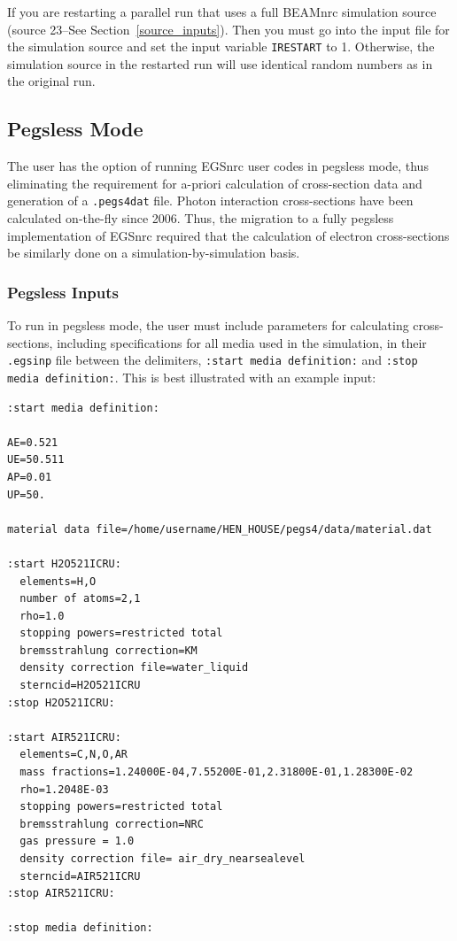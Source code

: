 \documentclass[12pt,twoside]{article}  %
\begin{document}
If you are restarting a parallel run that uses a full BEAMnrc simulation
source (source 23--See Section~\ref{source_inputs}).  Then you must go 
into the input file for the simulation source and set the input variable
{\tt IRESTART} to 1.  Otherwise, the simulation source in the restarted run
will use identical random numbers as in the original run.

\subsection{Pegsless Mode}
The user has the option of running EGSnrc user codes in pegsless
mode, thus eliminating the requirement for a-priori calculation of cross-section data and generation
of a {\tt .pegs4dat} file.  Photon interaction cross-sections have been calculated on-the-fly since
2006.  Thus, the migration to a fully pegsless implementation of EGSnrc required that
the calculation of electron cross-sections be similarly done on a simulation-by-simulation
basis.

\subsubsection{Pegsless Inputs}

To run in pegsless mode, the user must include parameters for calculating cross-sections, including
specifications for all media used in the simulation, in their {\tt .egsinp} file between the
delimiters, {\tt :start media definition:} and {\tt :stop media definition:}.  This is best illustrated
with an example input:

\begin{verbatim}
:start media definition:

AE=0.521
UE=50.511
AP=0.01
UP=50.

material data file=/home/username/HEN_HOUSE/pegs4/data/material.dat

:start H2O521ICRU:
  elements=H,O
  number of atoms=2,1
  rho=1.0
  stopping powers=restricted total
  bremsstrahlung correction=KM
  density correction file=water_liquid
  sterncid=H2O521ICRU
:stop H2O521ICRU:

:start AIR521ICRU:
  elements=C,N,O,AR
  mass fractions=1.24000E-04,7.55200E-01,2.31800E-01,1.28300E-02
  rho=1.2048E-03
  stopping powers=restricted total
  bremsstrahlung correction=NRC
  gas pressure = 1.0
  density correction file= air_dry_nearsealevel  
  sterncid=AIR521ICRU
:stop AIR521ICRU:

:stop media definition:
\end{verbatim}
\end{document}
